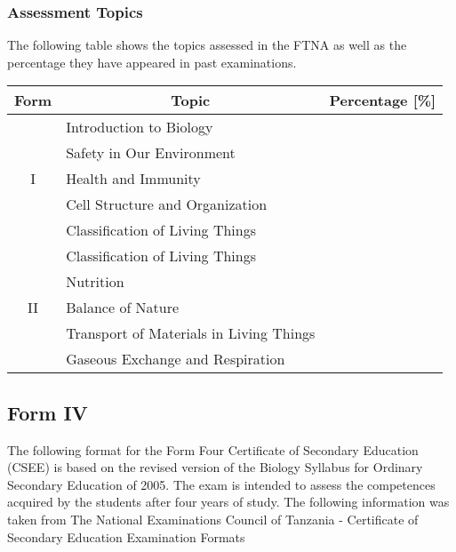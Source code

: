 \subsubsection{Assessment Topics}
\noindent The following table shows the topics assessed in the FTNA as well as the percentage they have appeared in past examinations. 
\begin{center}
	\begin{tabular}{|c|l|c|} \hline
		Form & \multicolumn{1}{|c|}{Topic} & Percentage [\%] \\ \hline
		\multirow{5}{*}{I} 	& Introduction to Biology					& \\ \cline{2-3}
						& Safety in Our Environment				& \\ \cline{2-3}
						& Health and Immunity					& \\ \cline{2-3}
						& Cell Structure and Organization			& \\ \cline{2-3}
						& Classification of Living Things			& \\ \hline
		\multirow{5}{*}{II} 	& Classification of Living Things			& \\ \cline{2-3}
						& Nutrition						 		& \\ \cline{2-3}
						& Balance of Nature						& \\ \cline{2-3}
						& Transport of Materials in Living Things		& \\ \cline{2-3}
						& Gaseous Exchange and Respiration		& \\ \hline
	\end{tabular}
\end{center}

\subsection{Form IV}
\noindent The following format for the Form Four Certificate of Secondary Education (CSEE) is based on the revised version of the Biology Syllabus for Ordinary Secondary Education of 2005. The exam is intended to assess the competences acquired by the students after four years of study. The following information was taken from The National Examinations Council of Tanzania - Certificate of Secondary Education Examination Formats %

